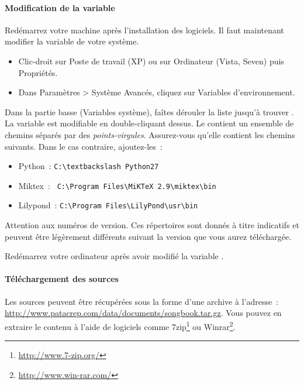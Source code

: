 \paragraph{Modification de la variable }

Redémarrez votre machine après l'installation des logiciels. 
Il faut maintenant modifier la variable  de votre
système.
\begin{itemize}
\item Clic-droit sur Poste de travail (XP) ou sur Ordinateur (Vista,
  Seven) puis Propriétés.
\item Dans Paramètres > Système Avancés, cliquez sur Variables
  d'environnement.
\end{itemize}

Dans la partie basse (Variables système), faîtes dérouler la liste
jusqu'à trouver . La variable est modifiable en
double-cliquant dessus. Le  contient un ensemble de
chemins séparés par des \emph{points-virgules}. Assurez-vous qu'elle
contient les chemins suivants. Dans le cas contraire, ajoutez-les~:
\begin{itemize}
\item Python~: \verb#C:\textbackslash Python27#
\item Miktex~: \verb# C:\Program Files\MiKTeX 2.9\miktex\bin#
\item Lilypond~: \verb#C:\Program Files\LilyPond\usr\bin#
\end{itemize}                     

\begin{nota}
Attention aux numéros de version. Ces répertoires sont donnés à titre
indicatifs et peuvent être légèrement différents suivant la version
que vous aurez téléchargée.
\end{nota}

Redémarrez votre ordinateur après avoir modifié la variable
.


\paragraph{Téléchargement des sources}

Les sources peuvent être récupérées sous la forme d'une archive
 à l'adresse~:
\url{http://www.patacrep.com/data/documents/songbook.tar.gz}. Vous
pouvez en extraire le contenu à l'aide de logiciels comme
7zip\footnote{\url{http://www.7-zip.org/}} ou
Winrar\footnote{\url{http://www.win-rar.com/}}.

